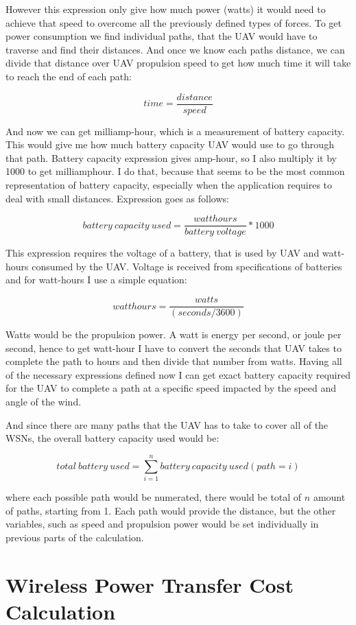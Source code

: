 \documentclass[11pt,a4paper,footinclude=true,headinclude=true, oneside]{scrbook}
\begin{document}
However this expression only give how much power (watts) it would need to achieve that speed to overcome all the previously defined types of forces. To get power consumption we find individual paths, that the UAV would have to traverse and find their distances. And once we know each paths distance, we can divide that distance over UAV propulsion speed to get how much time it will take to reach the end of each path:

\[time = \frac{distance}{speed}\]

And now we can get milliamp-hour, which is a measurement of battery capacity. This would give me how much battery capacity UAV would use to go through that path. Battery capacity expression gives amp-hour, so I also multiply it by 1000 to get milliamphour. I do that, because that seems to be the most common representation of battery capacity, especially when the application requires to deal with small distances. Expression goes as follows: 

\[battery\ capacity\ used = \frac{watthours}{battery\ voltage} * 1000\]

This expression requires the voltage of a battery, that is used by UAV and watt-hours consumed by the UAV. Voltage is received from specifications of batteries and for watt-hours I use a simple equation:

\[watthours = \frac{watts}{(seconds / 3600)}\]

Watts would be the propulsion power. A watt is energy per second, or joule per second, hence to get watt-hour I have to convert the seconds that UAV takes to complete the path to hours and then divide that number from watts. Having all of the necessary expressions defined now I can get exact battery capacity required for the UAV to complete a path at a specific speed impacted by the speed and angle of the wind.

And since there are many paths that the UAV has to take to cover all of the WSNs, the overall battery capacity used would be:

\[total\ battery\ used = \sum_{i=1}^{n} battery\ capacity\ used(path = i) \]

where each possible path would be numerated, there would be total of \(n\) amount of paths, starting from 1. Each path would provide the distance, but the other variables, such as speed and propulsion power would be set individually in previous parts of the calculation.

\section{Wireless Power Transfer Cost Calculation}
\end{document}
